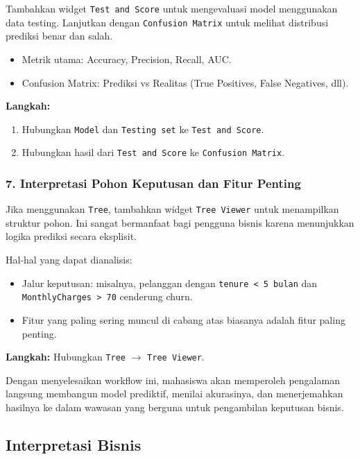 Tambahkan widget \texttt{Test and Score} untuk mengevaluasi model menggunakan data testing.  
Lanjutkan dengan \texttt{Confusion Matrix} untuk melihat distribusi prediksi benar dan salah.

\begin{itemize}
	\item Metrik utama: Accuracy, Precision, Recall, AUC.
	\item Confusion Matrix: Prediksi vs Realitas (True Positives, False Negatives, dll).
\end{itemize}

\textbf{Langkah:} 
\begin{enumerate}
	\item Hubungkan \texttt{Model} dan \texttt{Testing set} ke \texttt{Test and Score}.
	\item Hubungkan hasil dari \texttt{Test and Score} ke \texttt{Confusion Matrix}.
\end{enumerate}

\subsubsection*{7. Interpretasi Pohon Keputusan dan Fitur Penting}

Jika menggunakan \texttt{Tree}, tambahkan widget \texttt{Tree Viewer} untuk menampilkan struktur pohon. Ini sangat bermanfaat bagi pengguna bisnis karena menunjukkan logika prediksi secara eksplisit.

Hal-hal yang dapat dianalisis:
\begin{itemize}
	\item Jalur keputusan: misalnya, pelanggan dengan \texttt{tenure < 5 bulan} dan \texttt{MonthlyCharges > 70} cenderung churn.
	\item Fitur yang paling sering muncul di cabang atas biasanya adalah fitur paling penting.
\end{itemize}

\textbf{Langkah:} Hubungkan \texttt{Tree} $\rightarrow$ \texttt{Tree Viewer}.

\bigskip

\noindent
Dengan menyelesaikan workflow ini, mahasiswa akan memperoleh pengalaman langsung membangun model prediktif, menilai akurasinya, dan menerjemahkan hasilnya ke dalam wawasan yang berguna untuk pengambilan keputusan bisnis.

\subsection{Interpretasi Bisnis}

